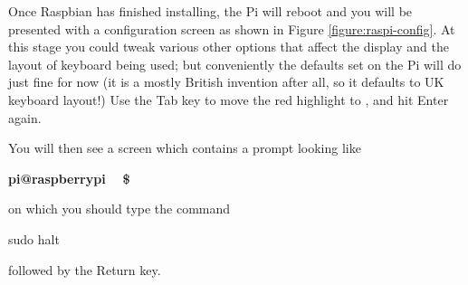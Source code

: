 Once Raspbian has finished installing, the Pi will reboot and you will
be presented with a configuration screen as shown in Figure \ref{figure:raspi-config}.
At this stage you could tweak various other options that affect the
display and the layout of keyboard being used; but conveniently the
defaults set on the Pi will do just fine for now (it is a mostly
British invention after all, so it defaults to UK keyboard layout!)
Use the Tab key to move the red highlight to , and hit
Enter again.






You will then see a screen which contains a prompt looking like

\begin{ttoutenv}
\textbf{pi@raspberrypi ~ \$  }
\end{ttoutenv}
on which you should type the command

\begin{ttoutenv}
sudo halt
\end{ttoutenv}
followed by the Return key.

